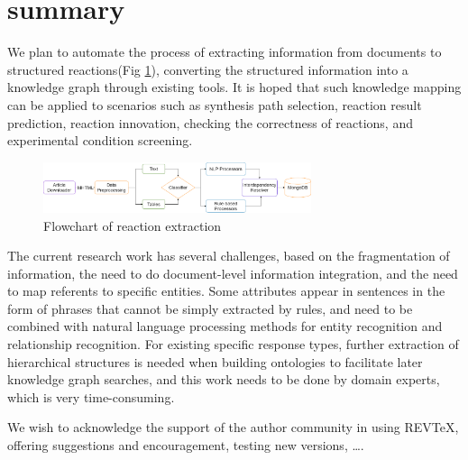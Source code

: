 \documentclass[%
 aip,
 jmp,%
 amsmath,amssymb,
 reprint,%
]{revtex4-2}
\begin{document}
\section{summary}
We plan to automate the process of extracting information from documents to structured reactions(Fig \ref{ Fig.7 }), 
converting the structured information into a knowledge graph through existing tools. It is hoped that such knowledge 
mapping can be applied to scenarios such as synthesis path
selection, reaction result prediction, reaction innovation, checking the correctness of reactions, and experimental condition screening.
\begin{figure}[htbp]
 \centering
 \includegraphics[width=0.7\textwidth]{figure/7.png}
 \caption{ Flowchart of reaction extraction }
 \label{ Fig.7 }
\end{figure}
The current research work has several challenges, based on the fragmentation of information, the need to do document-level information 
integration, and the need to map referents to specific entities. Some attributes appear in sentences in the form of phrases that cannot 
be simply extracted by rules, and need to be combined with natural language processing methods for entity recognition and relationship 
recognition. For existing specific response types, further extraction of hierarchical structures is needed when building ontologies to 
facilitate later knowledge graph searches, and this work needs to be done by domain experts, which is very time-consuming.

\begin{acknowledgments}
We wish to acknowledge the support of the author community in using
REV\TeX{}, offering suggestions and encouragement, testing new versions,
\dots.
\end{acknowledgments}

\nocite{*}
\end{document}
